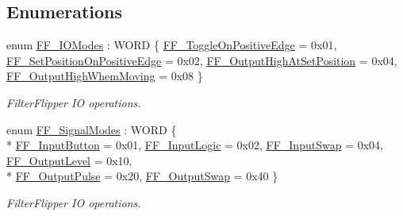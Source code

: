 \subsection*{Enumerations}
\begin{DoxyCompactItemize}
\item 
enum \hyperlink{group___filter_flipper_ga3f9223ae197e5703d709034a238d3925}{F\+F\+\_\+\+I\+O\+Modes} \+: W\+O\+RD \{ \hyperlink{group___filter_flipper_gga3f9223ae197e5703d709034a238d3925a8b4395a9b8320459546caac329359aa4}{F\+F\+\_\+\+Toggle\+On\+Positive\+Edge} = 0x01, 
\hyperlink{group___filter_flipper_gga3f9223ae197e5703d709034a238d3925a6c47560c56905b0152a796aafb3ece04}{F\+F\+\_\+\+Set\+Position\+On\+Positive\+Edge} = 0x02, 
\hyperlink{group___filter_flipper_gga3f9223ae197e5703d709034a238d3925a504383eab193dae725e9c19cbd16ce89}{F\+F\+\_\+\+Output\+High\+At\+Set\+Position} = 0x04, 
\hyperlink{group___filter_flipper_gga3f9223ae197e5703d709034a238d3925af4a48d66bb4952eef14b54d401260929}{F\+F\+\_\+\+Output\+High\+Whem\+Moving} = 0x08
 \}\begin{DoxyCompactList}\small\item\em Filter\+Flipper IO operations. \end{DoxyCompactList}
\item 
enum \hyperlink{group___filter_flipper_ga0049497885ad3480ad2ccbb1d354809a}{F\+F\+\_\+\+Signal\+Modes} \+: W\+O\+RD \{ \\*
\hyperlink{group___filter_flipper_gga0049497885ad3480ad2ccbb1d354809aa791b8a165109c49d41d5ad06142fca38}{F\+F\+\_\+\+Input\+Button} = 0x01, 
\hyperlink{group___filter_flipper_gga0049497885ad3480ad2ccbb1d354809aa8658558cb04d68f7b6a13ca3316022ca}{F\+F\+\_\+\+Input\+Logic} = 0x02, 
\hyperlink{group___filter_flipper_gga0049497885ad3480ad2ccbb1d354809aab1e5887ceee0bbc01e2ebe28816c90f8}{F\+F\+\_\+\+Input\+Swap} = 0x04, 
\hyperlink{group___filter_flipper_gga0049497885ad3480ad2ccbb1d354809aaa080722be5b4fd9c0c567f572badb61e}{F\+F\+\_\+\+Output\+Level} = 0x10, 
\\*
\hyperlink{group___filter_flipper_gga0049497885ad3480ad2ccbb1d354809aaa5076b7353004f7e2f924608c6d7ddd0}{F\+F\+\_\+\+Output\+Pulse} = 0x20, 
\hyperlink{group___filter_flipper_gga0049497885ad3480ad2ccbb1d354809aa4913e0d1cc2344a0a3f587f4e2a3a4a9}{F\+F\+\_\+\+Output\+Swap} = 0x40
 \}\begin{DoxyCompactList}\small\item\em Filter\+Flipper IO operations. \end{DoxyCompactList}
\end{DoxyCompactItemize}

